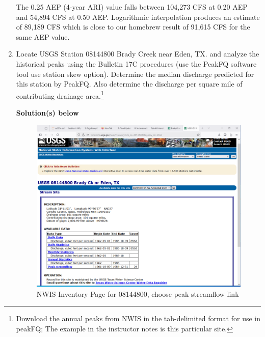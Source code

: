 \documentclass[12pt]{article}
\begin{document}
\begin{enumerate}
The 0.25 AEP (4-year ARI) value falls between 104,273 CFS at 0.20 AEP and 54,894 CFS at 0.50 AEP.  Logarithmic interpolation produces an estimate of 89,189 CFS which is close to our homebrew result of 91,615 CFS for the same AEP value.

\clearpage

\item  Locate USGS Station 08144800 Brady Creek near Eden, TX. and analyze the historical peaks using the Bulletin 17C procedures (use the PeakFQ software tool use station skew option).  Determine the median discharge predicted for this station by PeakFQ.  Also determine the discharge per square mile of contributing drainage area.\footnote{Download the annual peaks from NWIS in the tab-delimited format for use in peakFQ; The example in the instructor notes is this particular site.}

\textbf{Solution(s) below}
\begin{figure}[h!] %
   \centering
   \includegraphics[width=7in]{nwis-inventory.png} 
   \caption{NWIS Inventory Page for 08144800, choose peak streamflow link}
   \label{fig:nwis-inventory}
\end{figure}


\end{enumerate}
\end{document}
